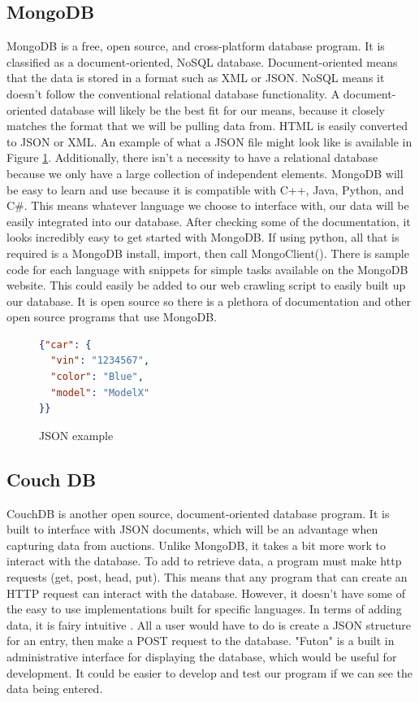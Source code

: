 \documentclass[draftclsnofoot,onecolumn,10pt]{IEEEtran}
\begin{document}
\subsection{MongoDB}
MongoDB is a free, open source, and cross-platform database program. It is classified as  a document-oriented, NoSQL database. Document-oriented means that the data is stored in a format such as XML or JSON. NoSQL means it doesn't follow the conventional relational database functionality. A document-oriented database will likely be the best fit for our means, because it closely matches the format that we will be pulling data from. HTML is easily converted to JSON or XML. An example of what a JSON file might look like is available in Figure \ref{fig:xmlvshtml}. Additionally, there isn't a necessity to have a relational database because we only have a large collection of independent elements. MongoDB will be easy to learn and use because it is compatible with C++, Java, Python, and C\#. This means whatever language we choose to interface with, our data will be easily integrated into our database. After checking some of the documentation, it looks incredibly easy to get started with MongoDB. If using python, all that is required is a MongoDB install, import, then call MongoClient(). There is sample code for each language with snippets for simple tasks available on the MongoDB website. This could easily be added to our web crawling script to easily built up our database. It is open source so there is a plethora of documentation and other open source programs that use MongoDB.  \cite{MongoDB}

\begin{figure}[h]
\centering

\begin{lstlisting}[language=json,firstnumber=1]
{"car": {
  "vin": "1234567",
  "color": "Blue",
  "model": "ModelX"
}}

\end{lstlisting}
\caption{JSON example}
\label{fig:xmlvshtml}
\end{figure}



\subsection{Couch DB}
CouchDB is another open source, document-oriented database program. It is built to interface with JSON documents, which will be an advantage when capturing data from auctions. Unlike MongoDB, it takes a bit more work to interact with the database. To add to retrieve data, a program must make http requests (get, post, head, put). This means that any program that can create an HTTP request can interact with the database. However, it doesn't have some of the easy to use implementations built for specific languages. In terms of adding data, it is fairy intuitive . All a user would have to do is create a JSON structure for an entry, then make a POST request to the database. "Futon" is a built in administrative interface for displaying the database, which would be useful for development. It could be easier to develop and test our program if we can see the data being entered. \cite{CouchDB}
\end{document}
